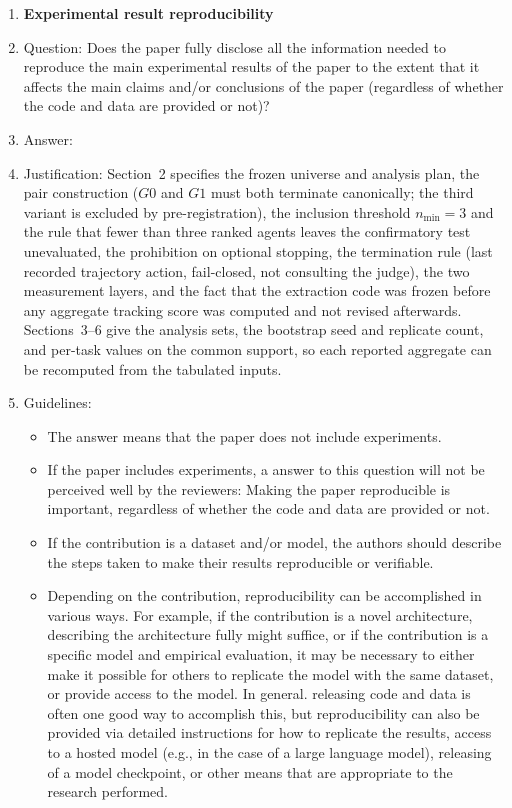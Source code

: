 \begin{enumerate}
    \item {\bf Experimental result reproducibility}
    \item[] Question: Does the paper fully disclose all the information needed to reproduce the main experimental results of the paper to the extent that it affects the main claims and/or conclusions of the paper (regardless of whether the code and data are provided or not)?
    \item[] Answer: \answerYes{}
    \item[] Justification: Section~2 specifies the frozen universe and analysis plan, the pair construction ($G0$ and $G1$ must both terminate canonically; the third variant is excluded by pre-registration), the inclusion threshold $n_{\min}=3$ and the rule that fewer than three ranked agents leaves the confirmatory test unevaluated, the prohibition on optional stopping, the termination rule (last recorded trajectory action, fail-closed, not consulting the judge), the two measurement layers, and the fact that the extraction code was frozen before any aggregate tracking score was computed and not revised afterwards. Sections~3--6 give the analysis sets, the bootstrap seed and replicate count, and per-task values on the common support, so each reported aggregate can be recomputed from the tabulated inputs.
    \item[] Guidelines:
    \begin{itemize}
        \item The answer \answerNA{} means that the paper does not include experiments.
        \item If the paper includes experiments, a \answerNo{} answer to this question will not be perceived well by the reviewers: Making the paper reproducible is important, regardless of whether the code and data are provided or not.
        \item If the contribution is a dataset and\slash or model, the authors should describe the steps taken to make their results reproducible or verifiable. 
        \item Depending on the contribution, reproducibility can be accomplished in various ways. For example, if the contribution is a novel architecture, describing the architecture fully might suffice, or if the contribution is a specific model and empirical evaluation, it may be necessary to either make it possible for others to replicate the model with the same dataset, or provide access to the model. In general. releasing code and data is often one good way to accomplish this, but reproducibility can also be provided via detailed instructions for how to replicate the results, access to a hosted model (e.g., in the case of a large language model), releasing of a model checkpoint, or other means that are appropriate to the research performed.

\end{itemize}
\end{enumerate}
